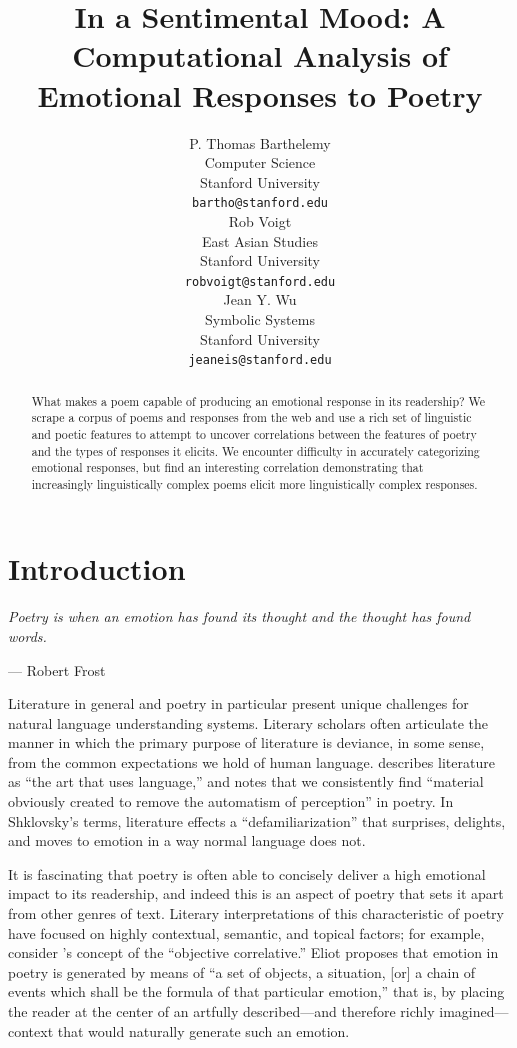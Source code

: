 \documentclass[11pt]{article}
\title{In a Sentimental Mood: A Computational Analysis of Emotional Responses to Poetry}
\author{P. Thomas Barthelemy \\
  Computer Science\\
  Stanford University \\
  {\tt bartho@stanford.edu} \\\And
  Rob Voigt \\
  East Asian Studies \\
  Stanford University \\
  {\tt robvoigt@stanford.edu} \\\And
  Jean Y. Wu \\
  Symbolic Systems  \\
  Stanford University\\
  {\tt jeaneis@stanford.edu} \\}
\date{}
\begin{document}
\maketitle
\begin{abstract}
What makes a poem capable of producing an emotional response in its readership? We scrape a corpus of poems and responses from the web and use a rich set of linguistic and poetic features to attempt to uncover correlations between the features of poetry and the types of responses it elicits. We encounter difficulty in accurately categorizing emotional responses, but find an interesting correlation demonstrating that increasingly linguistically complex poems elicit more linguistically complex responses.
\end{abstract}

\section{Introduction}

\paragraph{}
\emph{Poetry is when an emotion has found its thought and the thought has found words.}
\begin{flushright}
--- Robert Frost\\
\end{flushright}


Literature in general and poetry in particular present unique challenges for natural language understanding systems. Literary scholars often articulate the manner in which the primary purpose of literature is deviance, in some sense, from the common expectations we hold of human language.  describes literature as ``the art that uses language,'' and  notes that we consistently find ``material obviously created to remove the automatism of perception'' in poetry. In Shklovsky's terms, literature effects a ``defamiliarization'' that surprises, delights, and moves to emotion in a way normal language does not.

It is fascinating that poetry is often able to concisely deliver a high emotional impact to its readership, and indeed this is an aspect of poetry that sets it apart from other genres of text. Literary interpretations of this characteristic of poetry have focused on highly contextual, semantic, and topical factors; for example, consider 's concept of the ``objective correlative.'' Eliot proposes that emotion in poetry is generated by means of ``a set of objects, a situation, [or] a chain of events which shall be the formula of that particular emotion,'' that is, by placing the reader at the center of an artfully described---and therefore richly imagined---context that would naturally generate such an emotion.
\end{document}
